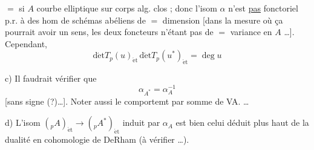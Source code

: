$=$ si $A$ courbe elliptique sur corps alg. clos ; donc
l'isom $\alpha$ n'est \uline{pas} fonctoriel p.r. à des
hom de schémas abéliens de $=$ dimension
[dans la mesure où ça pourrait avoir un
sens, les deux foncteurs n'étant pas de $=$
variance en $A$ \ldots]. Cependant, 
\[
\boxed{\operatorname{d\acute et} T_p(u)_{\mathrm{\acute et}}\,\operatorname{d\acute et} T_p(u^*)_{\mathrm{\acute et}}=\deg u}
\]

c) Il faudrait vérifier que
\[
\alpha_{A^*}=\alpha_A^{-1}
\]
[sans signe (?)\ldots]. Noter aussi le
comportemt par somme de VA. \ldots

d) L'isom $({}_pA)_{\mathrm{\acute et}}\mathbin{\to}({}_pA^*)_{\mathrm{\acute et}}$ induit par
$\alpha_A$ est bien celui déduit plus haut de
la dualité en cohomologie de DeRham
(à vérifier \ldots).
